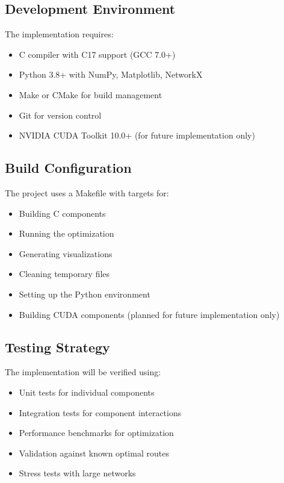 \documentclass[conference]{IEEEtran}
\begin{document}
\subsection{Development Environment}
The implementation requires:
\begin{itemize}
    \item C compiler with C17 support (GCC 7.0+)
    \item Python 3.8+ with NumPy, Matplotlib, NetworkX
    \item Make or CMake for build management
    \item Git for version control
    \item NVIDIA CUDA Toolkit 10.0+ (for future implementation only)
\end{itemize}

\subsection{Build Configuration}
The project uses a Makefile with targets for:
\begin{itemize}
    \item Building C components
    \item Running the optimization
    \item Generating visualizations
    \item Cleaning temporary files
    \item Setting up the Python environment
    \item Building CUDA components (planned for future implementation only)
\end{itemize}

\subsection{Testing Strategy}
The implementation will be verified using:
\begin{itemize}
    \item Unit tests for individual components
    \item Integration tests for component interactions
    \item Performance benchmarks for optimization
    \item Validation against known optimal routes
    \item Stress tests with large networks
\end{itemize}
\end{document}

